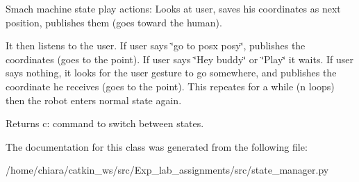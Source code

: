 Smach machine state play actions\+: Looks at user, saves his coordinates as next position, publishes them (goes toward the human). 

It then listens to the user. If user says \char`\"{}go to posx posy\char`\"{}, publishes the coordinates (goes to the point). If user says \char`\"{}\+Hey buddy\char`\"{} or \char`\"{}\+Play\char`\"{} it waits. If user says nothing, it looks for the user gesture to go somewhere, and publishes the coordinate he receives (goes to the point). This repeates for a while (n loops) then the robot enters normal state again. \begin{DoxyReturn}{Returns}
c\+: command to switch between states. 
\end{DoxyReturn}


The documentation for this class was generated from the following file\+:\begin{DoxyCompactItemize}
\item 
/home/chiara/catkin\+\_\+ws/src/\+Exp\+\_\+lab\+\_\+assignments/src/state\+\_\+manager.\+py\end{DoxyCompactItemize}
